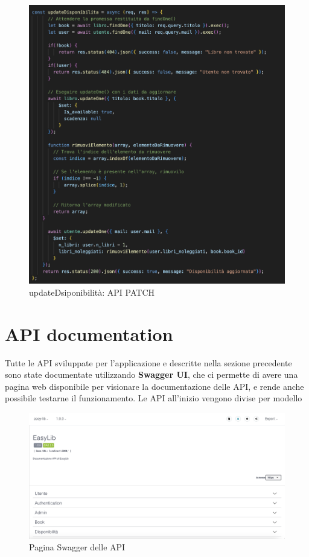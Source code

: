 \documentclass{article}
\begin{document}
\begin{figure}[H]
    \centering
    \includegraphics[width=120mm]{D4/Images/APIPatch.png}
    \caption{updateDsiponibilità: API PATCH}
\end{figure}


\section{API documentation}
Tutte le API sviluppate per l'applicazione e descritte nella sezione precedente sono state documentate utilizzando \textbf{Swagger UI}, che ci permette di avere una pagina web disponibile per visionare la documentazione delle API, e rende anche possibile testarne il funzionamento.
Le API all'inizio vengono divise per modello

\begin{figure}[H]
    \centering
    \includegraphics[width=130mm]{D4/Images/SwaggerHome.png}
    \caption{Pagina Swagger delle API}
\end{figure}
\end{document}
